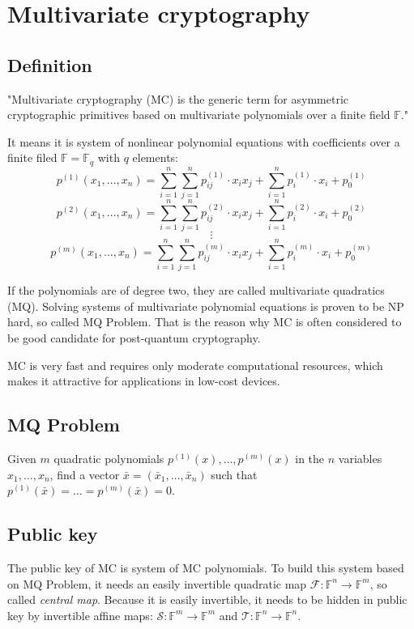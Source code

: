 \documentclass[thesis=M,english]{FITthesis}[2019/12/23]
\begin{document}
\newpage
\section{Multivariate cryptography}
\subsection{Definition}
"Multivariate cryptography (MC) is the generic term for asymmetric cryptographic primitives based on multivariate polynomials over a finite field $\mathbb{F}$."\cite{L-WIKI1}

It means it is system of nonlinear polynomial equations with coefficients over a finite filed $\mathbb{F} = \mathbb{F}_q$ with $q$ elements:
\[
	p^{(1)}(x_1,\ldots,x_n) = \sum\limits_{i=1}^{n} {\sum\limits_{j=1}^{n} {p_{ij}^{(1)} \cdot x_ix_j}} + \sum\limits_{i=1}^{n} {p_{i}^{(1)} \cdot x_i} + p_0^{(1)}
\]
\[
	p^{(2)}(x_1,\ldots,x_n) = \sum\limits_{i=1}^{n} {\sum\limits_{j=1}^{n} {p_{ij}^{(2)} \cdot x_ix_j}} + \sum\limits_{i=1}^{n} {p_{i}^{(2)} \cdot x_i} + p_0^{(2)}
\]
\[
	\vdots
\]
\[
	p^{(m)}(x_1,\ldots,x_n) = \sum\limits_{i=1}^{n} {\sum\limits_{j=1}^{n} {p_{ij}^{(m)} \cdot x_ix_j}} + \sum\limits_{i=1}^{n} {p_{i}^{(m)} \cdot x_i} + p_0^{(m)}
\]
 
If the polynomials are of degree two, they are called multivariate quadratics (MQ). Solving systems of multivariate polynomial equations is proven to be NP hard, so called MQ Problem. That is the reason why MC is often considered to be good candidate for post-quantum cryptography.

MC is very fast and requires only moderate computational resources, which makes it attractive for applications in low-cost devices.

\subsection{MQ Problem}
Given $m$ quadratic polynomials $p^{(1)}(x),\ldots,p^{(m)}(x)$ in the $n$ variables $x_1,\ldots,x_n$, find a vector $\bar{x} = (\bar{x}_1,\ldots,\bar{x}_n)$ such that $p^{(1)}(\bar{x}) = \ldots = p^{(m)}(\bar{x}) = 0$.

\subsection{Public key}
The public key of MC is system of MC polynomials. To build this system based on MQ Problem, it needs an easily invertible quadratic map $\mathcal{F}: \mathbb{F}^n \rightarrow \mathbb{F}^m$, so called \textit{central map}. Because it is easily invertible, it needs to be hidden in public key by invertible affine maps: $\mathcal{S}: \mathbb{F}^m \rightarrow \mathbb{F}^m$ and $\mathcal{T}: \mathbb{F}^n \rightarrow \mathbb{F}^n$.
\end{document}
